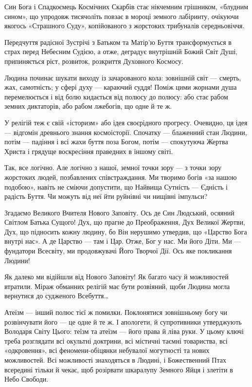 Син Бога і Спадкоємець Космічних Скарбів стає нікчемним грішником, «блудним
сином», що упродовж тисячоліть повзає в мороці земного лабіринту, очікуючи
якогось «Страшного Суду», копійованого з жорстоких трибуналів середньовіччя.

Передчуття радісної Зустрічі з Батьком та Матір’ю Буття трансформується в страх
перед Небесним Судією, а отже, деградує внутрішній Божий Світ Душі,
припиняється ріст, розвиток, розкриття Духовного Космосу.

Людина починає шукати виходу із зачарованого кола: зовнішній світ — смерть,
жах, самотність; у сфері духу — караючий суддя! Поміж цими жорнами душа
перемелюється і від болю кидається від полюсу до полюсу: або стає рабом земних
диктаторів, або рабом лжебогів, що одне й те ж.

У релігій теж є свій «історизм» або ідея своєрідного прогресу. Очевидно, ця
ідея — відгомін древнього знання космоісторії. Спочатку — блаженний стан
Людини, потім — падіння і всі жахи буття поза Богом, потім — спокутуюча Жертва
Христа і грядуще воскресіння праведних в іншому світі.

Так, все логічно. Але логічно з нашої, земної точки зору — з точки зору
жорстоких людей, позбавлених співстраждання. Ми творимо богів «за нашою
подобою», навіть не сміючи допустити, що Найвища Сутність — Єдність і радість
Буття. Чи можуть від неї йти руйнівні чи нищівні імпульси?

Згадаємо Великого Вчителя Нового Заповіту. Ось де Син Людський, осяяний Світлом
Батька Сущого! Дух, що прагне до Преображення, Дух Великої Жертви, Дух, що
підносить кожну людину, бо Він нерушимо утвердив, що «Царство Бога внутрі нас».
А де Царство — там і Цар. Отже, Бог у нас. Ми його Діти. Ми — фундатори
Всесвіту, ми продовжувачі Його Творчої Дії. Ось яке покликання Людини!

Як далеко ми відійшли від Нового Заповіту! Як багато часу й можливостей
втратили. Міраж обманних релігій має бути розвіяний, щоби Людина могла
вернутися до судженого Всебуття…

Атеїзм — інший полюс тієї ж помилки. Поклонятися зовнішньому богу чи
розвінчувати його — це одне й те ж. І апологети, й супротивники утверджують
Володаря Світу Цього: теїзм та атеїзм — його права й ліва руки. У цьому ключі
треба розглядати всі окультні доктрини, всі містичні таємні товариства, всі
«одкровення», всі феномени-обіцянки небувалої могутності та нових можливостей.
Всі можливості знаходяться в Людині, і Божественний Птах всередині тільки й
чекає, щоб розірвати шкаралупу Земного Яйця і злетіти в Небо Свободи.

